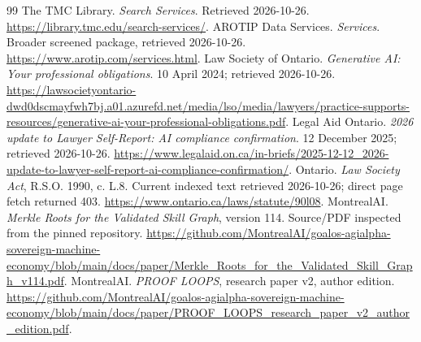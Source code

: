 \documentclass[11pt,letterpaper]{article}
\begin{document}
\begin{thebibliography}{99}
 The TMC Library. \emph{Search Services}. Retrieved 2026-10-26. \url{https://library.tmc.edu/search-services/}.
 AROTIP Data Services. \emph{Services}. Broader screened package, retrieved 2026-10-26. \url{https://www.arotip.com/services.html}.
 Law Society of Ontario. \emph{Generative AI: Your professional obligations}. 10 April 2024; retrieved 2026-10-26. \url{https://lawsocietyontario-dwd0dscmayfwh7bj.a01.azurefd.net/media/lso/media/lawyers/practice-supports-resources/generative-ai-your-professional-obligations.pdf}.
 Legal Aid Ontario. \emph{2026 update to Lawyer Self-Report: AI compliance confirmation}. 12 December 2025; retrieved 2026-10-26. \url{https://www.legalaid.on.ca/in-briefs/2025-12-12_2026-update-to-lawyer-self-report-ai-compliance-confirmation/}.
 Ontario. \emph{Law Society Act}, R.S.O. 1990, c. L.8. Current indexed text retrieved 2026-10-26; direct page fetch returned 403. \url{https://www.ontario.ca/laws/statute/90l08}.
 MontrealAI. \emph{Merkle Roots for the Validated Skill Graph}, version 114. Source/PDF inspected from the pinned repository. \url{https://github.com/MontrealAI/goalos-agialpha-sovereign-machine-economy/blob/main/docs/paper/Merkle_Roots_for_the_Validated_Skill_Graph_v114.pdf}.
 MontrealAI. \emph{PROOF LOOPS}, research paper v2, author edition. \url{https://github.com/MontrealAI/goalos-agialpha-sovereign-machine-economy/blob/main/docs/paper/PROOF_LOOPS_research_paper_v2_author_edition.pdf}.
\end{thebibliography}
\end{document}
